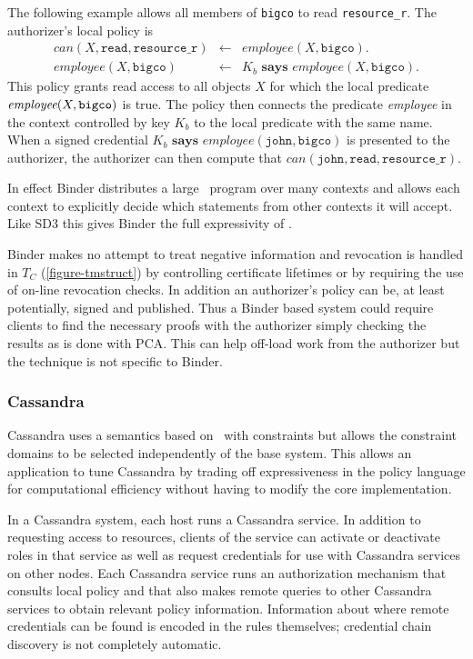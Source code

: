The following example \cite{DeTreville:BLBSL} allows all members of
\texttt{bigco} to read \texttt{re\-source\_r}. The authorizer's local policy
is
\begin{eqnarray*}
\textit{can}(X, \texttt{read}, \texttt{resource\_r}) & \leftarrow &
  \textit{employee}(X, \texttt{bigco}). \\
\textit{employee}(X, \texttt{bigco}) & \leftarrow &
  K_b\,\, \textbf{says}\,\, \textit{employee}(X, \texttt{bigco}).
\end{eqnarray*}
This policy grants read access to all objects $X$ for which the local
predicate $\textit{employee}\-(X, \texttt{bigco})$ is true. The policy then
connects the predicate \textit{employee} in the context controlled by key
$K_b$ to the local predicate with the same name. When a signed credential
$K_b\,\,\textbf{says}\,\,\textit{employee}(\texttt{john}, \texttt{bigco})$
is presented to the authorizer, the authorizer can then compute that
$\textit{can}(\texttt{john}, \texttt{read}, \texttt{resource\_r})$.

In effect Binder distributes a large \datalog\ program over many contexts
and allows each context to explicitly decide which statements from other
contexts it will accept. Like SD3 this gives Binder the full expressivity
of \datalog.

Binder makes no attempt to treat negative information and revocation is
handled in $T_C$ (\autoref{figure-tmstruct}) by controlling certificate
lifetimes or by requiring the use of on-line revocation checks. In addition
an authorizer's policy can be, at least potentially, signed and published.
Thus a Binder based system could require clients to find the necessary
proofs with the authorizer simply checking the results as is done with PCA.
This can help off-load work from the authorizer but the technique is not
specific to Binder. 

\subsubsection{Cassandra}

Cassandra \cite{Becker:CDACPTE,Becker:CFTMAEHR,Becker:CFTMAEHR2} uses
a semantics based on \datalog\ with constraints but allows the
constraint domains to be selected independently of the base
system. This allows an application to tune Cassandra by trading off
expressiveness in the policy language for computational efficiency
without having to modify the core implementation.

In a Cassandra system, each host runs a Cassandra service. In addition to
requesting access to resources, clients of the service can activate or
deactivate roles in that service as well as request credentials for use
with Cassandra services on other nodes. Each Cassandra service runs an
authorization mechanism that consults local policy and that also makes
remote queries to other Cassandra services to obtain relevant policy
information. Information about where remote credentials can be found is
encoded in the rules themselves; credential chain discovery is not
completely automatic.

